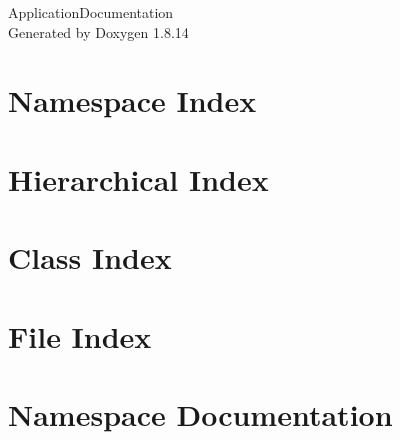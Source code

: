 \documentclass[twoside]{book}
\newcommand{\+}{\discretionary{\mbox{\scriptsize$\hookleftarrow$}}{}{}}
\newcommand{\clearemptydoublepage}{%
  \newpage{\pagestyle{empty}\cleardoublepage}%
}
\begin{document}
\hypersetup{pageanchor=false,
             bookmarksnumbered=true,
             pdfencoding=unicode
            }
\begin{titlepage}
\vspace*{7cm}
\begin{center}%
{\Large Application\+Documentation }\\
\vspace*{1cm}
{\large Generated by Doxygen 1.8.14}\\
\end{center}
\end{titlepage}
\clearemptydoublepage
{}
\tableofcontents
\clearemptydoublepage
{}
\hypersetup{pageanchor=true}

\chapter{Namespace Index}

\chapter{Hierarchical Index}

\chapter{Class Index}

\chapter{File Index}

\chapter{Namespace Documentation}





\end{document}
